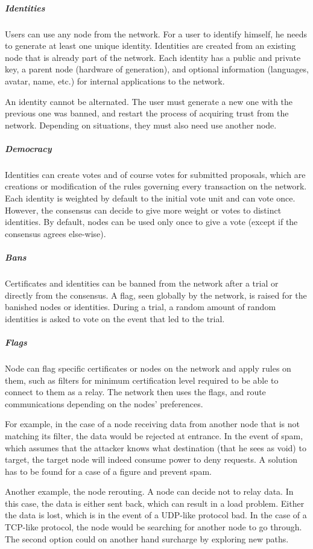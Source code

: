 \subparagraph{Identities} Users can use any node from the network. For a user to identify himself, he needs to generate at least one unique identity. Identities are created from an existing node that is already part of the network. Each identity has a public and private key, a parent node (hardware of generation), and optional information (languages, avatar, name, etc.) for internal applications to the network.

An identity cannot be alternated. The user must generate a new one with the previous one was banned, and restart the process of acquiring trust from the network. Depending on situations, they must also need use another node.

\subparagraph{Democracy} Identities can create votes and of course votes for submitted proposals, which are creations or modification of the rules governing every transaction on the network. Each identity is weighted by default to the initial vote unit and can vote once. However, the consensus can decide to give more weight or votes to distinct identities. By default, nodes can be used only once to give a vote (except if the consensus agrees else-wise).

\subparagraph{Bans} Certificates and identities can be banned from the network after a trial or directly from the consensus. A flag, seen globally by the network, is raised for the banished nodes or identities. During a trial, a random amount of random identities is asked to vote on the event that led to the trial.

\subparagraph{Flags} Node can flag specific certificates or nodes on the network and apply rules on them, such as filters for minimum certification level required to be able to connect to them as a relay. The network then uses the flags, and route communications depending on the nodes' preferences.

For example, in the case of a node receiving data from another node that is not matching its filter, the data would be rejected at entrance. In the event of spam, which assumes that the attacker knows what destination (that he sees as void) to target, the target node will indeed consume power to deny requests. A solution has to be found for a case of a figure and prevent spam.

Another example, the node rerouting. A node can decide not to relay data. In this case, the data is either sent back, which can result in a load problem. Either the data is lost, which is in the event of a UDP-like protocol bad. In the case of a TCP-like protocol, the node would be searching for another node to go through. The second option could on another hand surcharge by exploring new paths.

